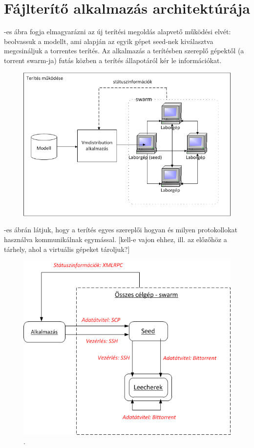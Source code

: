 \section{Fájlterítő alkalmazás architektúrája}
\label{design_apparchi}

-es ábra fogja elmagyarázni az új terítési megoldás alapvető működési elvét: beolvassuk a modellt, ami alapján az egyik gépet seed-nek kiválasztva megcsináljuk a torrentes terítés. Az alkalmazás a terítésben szereplő gépektől (a torrent swarm-ja) futás közben a terítés állapotáról kér le információkat.

\begin{figure}[ht]
	\centering
	\includegraphics[width=130mm, keepaspectratio]{figures/design_overview.png}
	\caption{}
	\label{fig:designoverview}
\end{figure}

-es ábrán látjuk, hogy a terítés egyes szereplői hogyan és milyen protokollokat használva kommunikálnak egymással. [kell-e vajon ehhez, ill. az előzőhöz a tárhely, ahol a virtuális gépeket tároljuk?]

\begin{figure}[ht]
	\centering
	\includegraphics[width=140mm, keepaspectratio]{figures/design_protocols.png}
	\caption{.}
	\label{fig:designprotocols}
\end{figure}

